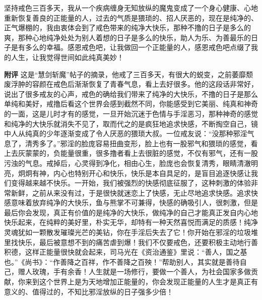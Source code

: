 \begin{case}
    坚持戒色三百多天，我从一个疾病缠身无知放纵的魔鬼变成了一个身心健康、心地重新恢复善良的正能量的人，过去的气质是猥琐的、招人厌恶的，现在是纯净的、正气爆棚的，我由衷体会到了戒色带来的纯净大快乐，那种不撸的日子是多么的爽，那种心地纯净处处为别人着想的日子是多么的快乐，助人为乐、为善最乐的日子是有多么的幸福。感恩戒色吧，让我做回一个正能量的人，感恩戒色吧点缀了我的人生，让我觉得世间如此纯真美妙！

    \textbf{附评} 这是“慧剑斩魔”帖子的摘录，他戒了三百多天，有很大的蜕变，之前萎靡颓废浮肿的容颜在戒色后渐渐恢复了青春气息，看上去好很多。他的这段话非常好，说出了很多戒友的心声，戒色的确给我们带来了纯净的大快乐，不撸的日子是那么单纯和美好，戒撸后看这个世界会感到截然不同，你能感受到它美丽、纯真和神奇的一面，这是儿时才有的感觉，一旦开始沉迷于色情与手淫恶习，那种神奇的感觉和纯净的大快乐就消失不见了，取而代之的是疯狂地追求快感，不断掏空自己，镜中人从纯真的少年逐渐变成了令人厌恶的猥琐大叔。一位戒友说：“没那种邪淫气息了，清秀多了。”邪淫的脸庞容易扭曲变形，脸上也有一股邪气和猥琐的感觉，看上去灰蒙蒙的，负能量很重，很多撸者看上去很脏的感觉，不仅有邪气，还有一股污浊的气息。戒掉后，心灵得到净化，相由心生，脸庞也会恢复清秀，眼睛清澈明亮，炯炯有神，内心也特别开心和快乐，快乐是本自具足的，是盲目追逐快感让我们变得越来越不快乐。一开始，我们被强烈的快感彻底征服了，这种刺激的体验非常新鲜，之前从来没有过，于是很快就迷恋上了快感，无止尽地追求快感。追求快感意味着放弃纯净的大快乐，鱼与熊掌不可兼得，快感的确吸引人，很刺激，但是最后你会发现，真正有价值的是纯净的大快乐，做纯净的自己才能真正发自内心地快乐起来，在纯粹的美好里，朴实无华，却特有一种天然喜悦而满足的质感！纯净灵魂犹如一颗散发璀璨光芒的美钻，你在手淫后失去了它！你开始在邪淫的垃圾堆里找快乐，最后被意想不到的痛苦虐到爆！我们不仅要戒色，还要积极主动地行善积德，这样正能量很快就会起来，司马光在《资治通鉴》里说：“善人，国之基也。”《尚书》：“作善降之百祥，作不善降之百殃！”帮助别人，其实就是善待自己，赠人玫瑰，手有余香！人生就是一场修行，要做一个善人，为社会国家多做贡献，你来到这个世界上是为天地增加正能量的，你会发现正能量的人生才是真正有意义的、值得过的，不知比邪淫放纵的日子强多少倍！
\end{case}

